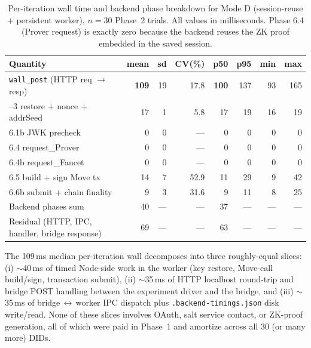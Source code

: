 \begin{table}[h]
\centering
\small
\caption{Per-iteration wall time and backend phase breakdown for
Mode D (session-reuse + persistent worker), $n = 30$ Phase~2 trials.
All values in milliseconds. Phase 6.4 (Prover request) is exactly zero
because the backend reuses the ZK proof embedded in the saved session.}
\label{tab:session-reuse-stats}
\begin{tabular}{lrrrrrrr}
\toprule
\textbf{Quantity} & \textbf{mean} & \textbf{sd} & \textbf{CV(\%)}
                  & \textbf{p50} & \textbf{p95} & \textbf{min} & \textbf{max} \\
\midrule
\texttt{wall\_post} (HTTP req $\to$ resp)
                                   & \textbf{109} & 19 & 17.8 & \textbf{100} & 137 & 93 & 165 \\
\addlinespace
6.1--3 restore + nonce + addrSeed  &  17 &  1 &  5.8 &  17 &  19 & 16 & 19 \\
6.1b JWK precheck                  &   0 &  0 &  --- &   0 &   0 &  0 &  0 \\
6.4  request\_Prover               &   0 &  0 &  --- &   0 &   0 &  0 &  0 \\
6.4b request\_Faucet               &   0 &  0 &  --- &   0 &   0 &  0 &  0 \\
6.5  build + sign Move tx          &  14 &  7 & 52.9 &  11 &  29 &  9 & 42 \\
6.6b submit + chain finality       &   9 &  3 & 31.6 &   9 &  11 &  8 & 25 \\
\midrule
Backend phases sum                 &  40 & --- & --- &  37 & --- & --- & --- \\
Residual (HTTP, IPC, handler, bridge response) & 69 & --- & --- & 63 & --- & --- & --- \\
\bottomrule
\end{tabular}
\end{table}

\noindent
The 109\,ms median per-iteration wall decomposes into three
roughly-equal slices: (i) \(\sim\)40\,ms of timed Node-side work in the
worker (key restore, Move-call build/sign, transaction submit), (ii)
\(\sim\)35\,ms of HTTP localhost round-trip and bridge POST handling
between the experiment driver and the bridge, and (iii) \(\sim\)35\,ms
of bridge\,$\leftrightarrow$\,worker IPC dispatch plus
\texttt{.backend-timings.json} disk write/read. None of these slices
involves OAuth, salt service contact, or ZK-proof generation, all of
which were paid in Phase~1 and amortize across all 30 (or many more)
DIDs.


